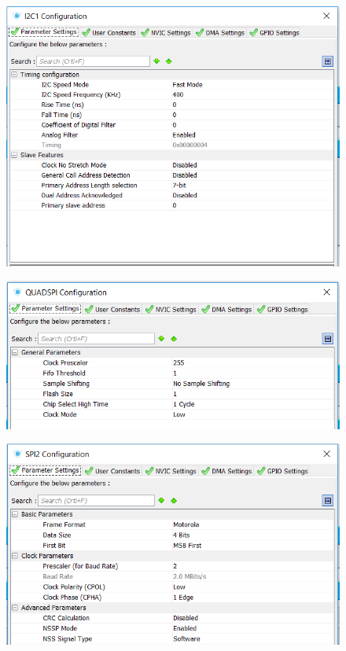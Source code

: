\documentclass[10pt, a4paper]{article}
\begin{document}
\begin{enumerate}
\begin{figure}[H]
	\includegraphics[width=\linewidth]{conf4.png}
	\end{figure}
		\begin{figure}[H]
	\centering
	\includegraphics[width=\linewidth]{conf5.png}
	\end{figure}
		\begin{figure}[H]
	\centering
	\includegraphics[width=\linewidth]{conf6.png}

\end{figure}
\end{enumerate}
\end{document}
